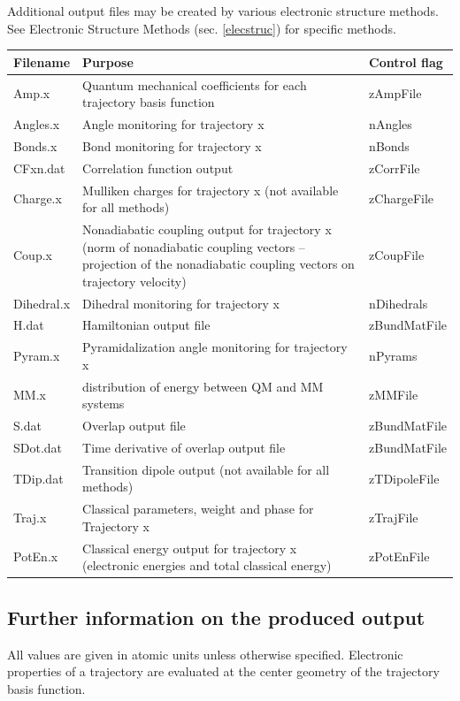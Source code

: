 \documentclass[11pt]{article}
\begin{document}
Additional output files may be created by various electronic structure
methods. See Electronic Structure Methods  (sec. \ref{elecstruc}) for
specific methods. \\


\begin{tabular}{ | l | p{3in} | l | }
\hline
 \textbf{Filename} & \textbf{Purpose} & \textbf{Control flag} \\ \hline 
 Amp.x & Quantum mechanical coefficients for each trajectory basis function & zAmpFile \\ \hline 
 Angles.x & Angle monitoring for trajectory x & nAngles \\ \hline 
 Bonds.x & Bond monitoring for trajectory x & nBonds \\ \hline 
 CFxn.dat & Correlation function output & zCorrFile \\ \hline 
 Charge.x & Mulliken charges for trajectory x (not available for all methods) & zChargeFile \\ \hline 
 Coup.x & Nonadiabatic coupling output for trajectory x (norm of nonadiabatic coupling vectors -- projection of the nonadiabatic coupling vectors on trajectory velocity) & zCoupFile \\ \hline 
 Dihedral.x & Dihedral monitoring for trajectory x & nDihedrals \\ \hline 
 H.dat & Hamiltonian output file & zBundMatFile \\ \hline 
 Pyram.x & Pyramidalization angle monitoring for trajectory x & nPyrams \\ \hline 
 MM.x & distribution of energy between QM and MM systems & zMMFile \\ \hline 
 S.dat & Overlap output file & zBundMatFile \\ \hline 
 SDot.dat & Time derivative of overlap output file & zBundMatFile \\ \hline 
 TDip.dat & Transition dipole output (not available for all methods) & zTDipoleFile \\ \hline 
 Traj.x & Classical parameters, weight and phase for Trajectory x & zTrajFile \\ \hline 
 PotEn.x & Classical energy output for trajectory x (electronic energies and total classical energy) & zPotEnFile \\ \hline 
\end{tabular}


\subsection{Further information on the produced output}
All values are given in
atomic units unless otherwise specified. Electronic properties of a trajectory are evaluated at the center geometry of 
the trajectory basis function.
\end{document}
